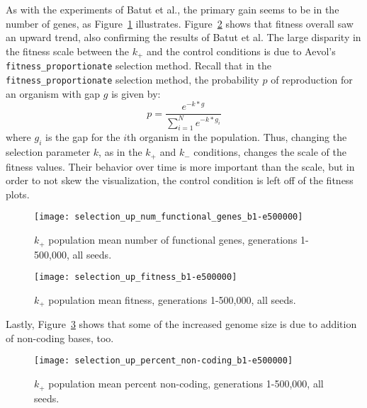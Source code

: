 As with the experiments of Batut et al., the primary gain seems to be in the number of genes, as Figure~\ref{fig:selection_up_num_functional_genes} illustrates. Figure~\ref{fig:selection_up_fitness} shows that fitness overall saw an upward trend, also confirming the results of Batut et al. The large disparity in the fitness scale between the $k_+$ and the control conditions is due to Aevol's \texttt{fitness\_proportionate} selection method. Recall that in the \texttt{fitness\_proportionate} selection method, the probability $p$ of reproduction for an organism with gap $g$ is given by:
\begin{equation*}
p = \frac{e^{-k*g}}{\sum_{i=1}^{N}e^{-k*g_i}}
\end{equation*}
where $g_i$ is the gap for the $i$th organism in the population. Thus, changing the selection parameter $k$, as in the $k_+$ and $k_-$ conditions, changes the scale of the fitness values. Their behavior over time is more important than the scale, but in order to not skew the visualization, the control condition is left off of the fitness plots.

\begin{figure}[H]
	\centering
	\texttt{[image: selection\_up\_num\_functional\_genes\_b1-e500000]}
	\caption[Selection up number of functional genes]{$k_+$ population mean number of functional genes, generations 1-500,000, all seeds.}
	\label{fig:selection_up_num_functional_genes}
\end{figure}

\begin{figure}[H]
	\centering
	\texttt{[image: selection\_up\_fitness\_b1-e500000]}
	\caption[Selection up fitness]{$k_+$ population mean fitness, generations 1-500,000, all seeds.}
	\label{fig:selection_up_fitness}
\end{figure}

Lastly, Figure~\ref{fig:selection_up_perc_non-coding} shows that some of the increased genome size is due to addition of non-coding bases, too. 

\begin{figure}[H]
	\centering
	\texttt{[image: selection\_up\_percent\_non-coding\_b1-e500000]}
	\caption[Selection up percent non-coding]{$k_+$ population mean percent non-coding, generations 1-500,000, all seeds.}
	\label{fig:selection_up_perc_non-coding}
\end{figure}
